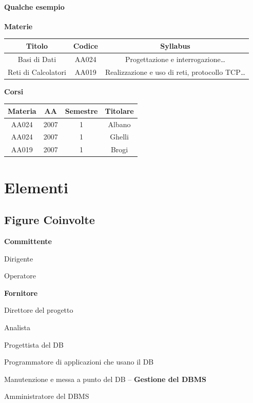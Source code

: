\documentclass[10pt]{book}
\begin{document}
\paragraph{Qualche esempio}
\begin{center}
\textbf{Materie}\\
	\begin{tabular}{c | c | c}
	\textbf{Titolo} & \textbf{Codice} & \textbf{Syllabus} \\
	\hline
	Basi di Dati & AA024 & Progettazione e interrogazione\ldots \\
	\hline
	Reti di Calcolatori & AA019 & Realizzazione e uso di reti, protocollo TCP\ldots
	\end{tabular}
\end{center}
\begin{center}
\textbf{Corsi}\\
	\begin{tabular}{c | c | c | c}
	\textbf{Materia} & \textbf{AA} & \textbf{Semestre} & \textbf{Titolare} \\
	\hline
	AA024 & 2007 & 1 & Albano \\
	\hline
	AA024 & 2007 & 1 & Ghelli \\
	\hline
	AA019 & 2007 & 1 & Brogi 
	\end{tabular}
\end{center}
\section{Elementi}
\subsection{Figure Coinvolte}
\begin{list}{}{}
	\item \textbf{Committente}
	\begin{list}{}{}
		\item Dirigente
		\item Operatore
	\end{list}
	\item \textbf{Fornitore}
	\begin{list}{}{}
		\item Direttore del progetto
		\item Analista
		\item Progettista del DB
		\item Programmatore di applicazioni che usano il DB
	\end{list}
	\item Manutenzione e messa a punto del DB -- \textbf{Gestione del DBMS}
	\begin{list}{}{}
		\item Amministratore del DBMS
	\end{list}
\end{list}
\end{document}

